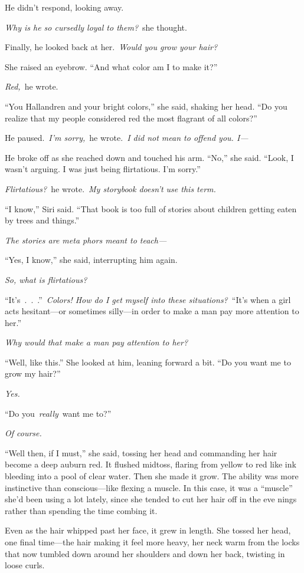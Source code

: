 He didn’t respond, looking away.

\textit{Why is he so cursedly loyal to them?}~she thought.

Finally, he looked back at her.~\textit{Would you grow your hair?}

She raised an eyebrow. “And what color am I to make it?”

\textit{Red,}~he wrote.

“You Hallandren and your bright colors,” she said, shaking her head. “Do you realize that my people considered red the most flagrant of all colors?”

He paused.~\textit{I’m sorry,}~he wrote.~\textit{I did not mean to offend you. I—}

He broke off as she reached down and touched his arm. “No,” she said. “Look, I wasn’t arguing. I was just being flirtatious. I’m sorry.”

\textit{Flirtatious?}~he wrote.~\textit{My storybook doesn’t use this term.}

“I know,” Siri said. “That book is too full of stories about children getting eaten by trees and things.”

\textit{The stories are meta phors meant to teach—}

“Yes, I know,” she said, interrupting him again.

\textit{So, what is flirtatious?}

“It’s~.~.~.”~\textit{Colors! How do I get myself into these situations?}~“It’s when a girl acts hesitant—or sometimes silly—in order to make a man pay more attention to her.”

\textit{Why would that make a man pay attention to her?}

“Well, like this.” She looked at him, leaning forward a bit. “Do you want me to grow my hair?”

\textit{Yes.}

“Do you~\textit{really}~want me to?”

\textit{Of course.}

“Well then, if I must,” she said, tossing her head and commanding her hair become a deep auburn red. It flushed midtoss, flaring from yellow to red like ink bleeding into a pool of clear water. Then she made it grow. The ability was more instinctive than conscious—like flexing a muscle. In this case, it was a “muscle” she’d been using a lot lately, since she tended to cut her hair off in the eve nings rather than spending the time combing it.

Even as the hair whipped past her face, it grew in length. She tossed her head, one final time—the hair making it feel more heavy, her neck warm from the locks that now tumbled down around her shoulders and down her back, twisting in loose curls.

